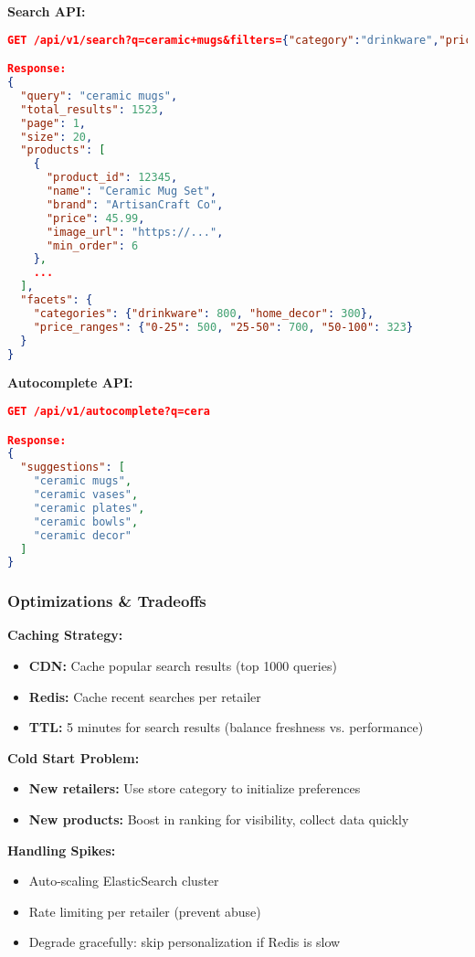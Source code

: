 \documentclass[11pt,letterpaper]{article}
\begin{document}
\textbf{Search API:}
\begin{lstlisting}[language=json]
GET /api/v1/search?q=ceramic+mugs&filters={"category":"drinkware","price_max":50}&page=1&size=20

Response:
{
  "query": "ceramic mugs",
  "total_results": 1523,
  "page": 1,
  "size": 20,
  "products": [
    {
      "product_id": 12345,
      "name": "Ceramic Mug Set",
      "brand": "ArtisanCraft Co",
      "price": 45.99,
      "image_url": "https://...",
      "min_order": 6
    },
    ...
  ],
  "facets": {
    "categories": {"drinkware": 800, "home_decor": 300},
    "price_ranges": {"0-25": 500, "25-50": 700, "50-100": 323}
  }
}
\end{lstlisting}

\textbf{Autocomplete API:}
\begin{lstlisting}[language=json]
GET /api/v1/autocomplete?q=cera

Response:
{
  "suggestions": [
    "ceramic mugs",
    "ceramic vases",
    "ceramic plates",
    "ceramic bowls",
    "ceramic decor"
  ]
}
\end{lstlisting}

\subsubsection{Optimizations \& Tradeoffs}

\textbf{Caching Strategy:}
\begin{itemize}
    \item \textbf{CDN:} Cache popular search results (top 1000 queries)
    \item \textbf{Redis:} Cache recent searches per retailer
    \item \textbf{TTL:} 5 minutes for search results (balance freshness vs. performance)
\end{itemize}

\textbf{Cold Start Problem:}
\begin{itemize}
    \item \textbf{New retailers:} Use store category to initialize preferences
    \item \textbf{New products:} Boost in ranking for visibility, collect data quickly
\end{itemize}

\textbf{Handling Spikes:}
\begin{itemize}
    \item Auto-scaling ElasticSearch cluster
    \item Rate limiting per retailer (prevent abuse)
    \item Degrade gracefully: skip personalization if Redis is slow
\end{itemize}
\end{document}
